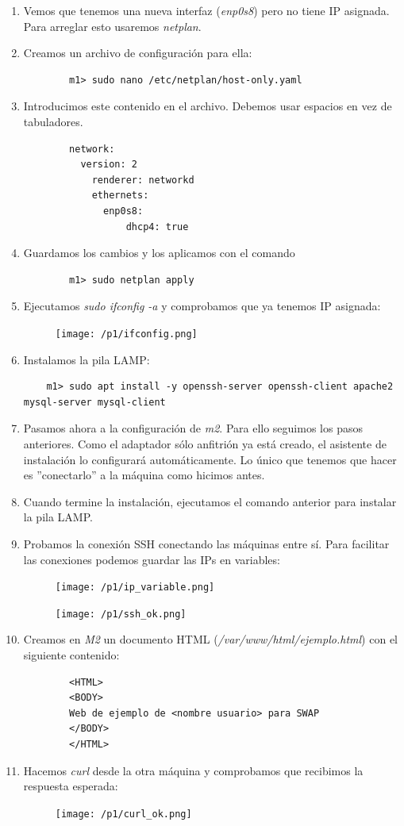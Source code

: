 \documentclass[12pt,spanish]{article}
\begin{document}
\begin{enumerate}
	\item Vemos que tenemos una nueva interfaz (\emph{enp0s8}) pero no tiene IP asignada. Para arreglar esto usaremos \emph{netplan}.
	\item Creamos un archivo de configuración para ella:
	\begin{lstlisting}
		m1> sudo nano /etc/netplan/host-only.yaml
	\end{lstlisting}
	\item Introducimos este contenido en el archivo. Debemos usar espacios en vez de tabuladores.
	\begin{lstlisting}
		network:
		  version: 2
			renderer: networkd
			ethernets:
			  enp0s8:
				  dhcp4: true
	\end{lstlisting}
	\item Guardamos los cambios y los aplicamos con el comando
	\begin{lstlisting}
		m1> sudo netplan apply
	\end{lstlisting}
	\item Ejecutamos \emph{sudo ifconfig -a} y comprobamos que ya tenemos IP asignada:
	\begin{figure}[H]
		\centering
		\texttt{[image: /p1/ifconfig.png]}
	\end{figure}
	\item Instalamos la pila LAMP:
	\begin{lstlisting}
	m1> sudo apt install -y openssh-server openssh-client apache2 mysql-server mysql-client
	\end{lstlisting}
	\item Pasamos ahora a la configuración de \emph{m2}. Para ello seguimos los pasos anteriores. Como el adaptador sólo anfitrión ya está creado, el asistente de instalación lo configurará automáticamente. Lo único que tenemos que hacer es ''conectarlo'' a la máquina como hicimos antes.
	\item Cuando termine la instalación, ejecutamos el comando anterior para instalar la pila LAMP.
	\item Probamos la conexión SSH conectando las máquinas entre sí. Para facilitar las conexiones podemos guardar las IPs en variables:
	\begin{figure}[H]
		\centering
		\texttt{[image: /p1/ip\_variable.png]}
	\end{figure}
	\begin{figure}[H]
		\centering
		\texttt{[image: /p1/ssh\_ok.png]}
	\end{figure}
	\item Creamos en \emph{M2} un documento HTML (\emph{/var/www/html/ejemplo.html}) con el siguiente contenido:
	\begin{lstlisting}
		<HTML>
		<BODY>
		Web de ejemplo de <nombre usuario> para SWAP
		</BODY>
		</HTML>
	\end{lstlisting}
	\item Hacemos \emph{curl} desde la otra máquina y comprobamos que recibimos la respuesta esperada:
	\begin{figure}[H]
		\centering
		\texttt{[image: /p1/curl\_ok.png]}
	\end{figure}
\end{enumerate}
\end{document}
